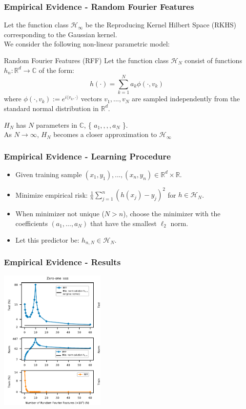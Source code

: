 \documentclass{beamer}
\begin{document}
\begin{frame}
\frametitle{Empirical Evidence - Random Fourier Features}
Let the function class  $\mathcal{H}_\infty$ be the Reproducing Kernel Hilbert Space (RKHS) corresponding to the Gaussian kernel.\\
We consider the following non-linear parametric model:
\begin{block}{Random Fourier Features (RFF)}
	Let the function class  $\mathcal{H}_N $ consist of functions $h_n : \mathbb{R}^d \to \mathbb{C}$ of the form:
	\[ h(\cdot) = \sum_{k=1}^{N} a_k\phi(\cdot, v_k) \] 
	where $\phi(\cdot , v_k) := e^{i
	\langle v_k , \cdot \rangle }$
	vectors $v_1, ... , v_N$ are sampled independently from the standard normal distribution in $\mathbb{R}^d$.
\end{block}
$H_N$ has $N$ parameters in $\mathbb{C}$, \{ $a_1, ,,, a_N$ \}.\\
As $N \to \infty$, $H_N$ becomes a closer approximation to $\mathcal{H}_\infty$
\end{frame}

\begin{frame}
\frametitle{Empirical Evidence - Learning Procedure}
\begin{itemize}[itemsep = 12pt]
	\item Given training sample $(x_1, y_1), ..., (x_n, y_n) \in \mathbb{R}^d \times \mathbb{R}$.
	\item Minimize empirical risk: $\frac{1}{n}\sum_{j=1}^{n}(h(x_j)-y_j)^2$ for $h \in \mathcal{H}_N$.
	\item When minimizer not unique ($N > n$), choose the minimizer with the coefficients $(a_1, ..., a_N)$ that have the smallest $\ell_2$ norm.
	\item Let this predictor be: $h_{n,N} \in \mathcal{H}_N$.
\end{itemize}
\end{frame}

\begin{frame}
\frametitle{Empirical Evidence - Results}
\centering
\includegraphics[height=7cm]{RFF-results.png}
\end{frame}
\end{document}
